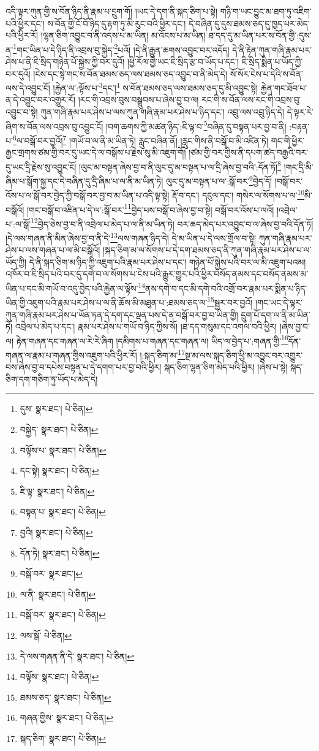 འདི་ལྟར་ཀུན་གྱི་ས་བོན་ཉིད་ནི་རྣམ་པ་དྲུག་གོ། །ཡང་དེ་དག་ནི་སྐད་ཅིག་པ་སྟེ། གཉི་ག་ཡང་བྱུང་མ་ཐག་ཏུ་འཇིག་པའི་ཕྱིར་དང་། ས་བོན་གྱི་ངོ་བོ་ཉིད་དུ་རྟག་ཏུ་མི་རུང་བའི་ཕྱིར་དང་། དེ་བཞིན་དུ་དུས་ཐམས་ཅད་དུ་ཁྱད་པར་མེད་པའི་ཕྱིར་རོ། །ལྷན་ཅིག་འབྱུང་བ་ནི་འདས་པ་མ་ཡིན། མ་འོངས་པ་མ་ཡིན། ཐ་དད་དུ་མ་ཡིན་པར་ས་བོན་གྱི་:དུས་ན་\footnote{དུས་  སྣར་ཐང་།  པེ་ཅིན། }གང་ཡིན་པ་དེ་ཉིད་ནི་འབྲས་བུ་སྐྱེད་\footnote{བསྐྱེད་  སྣར་ཐང་།  པེ་ཅིན། }པའོ། །དེ་ནི་རྒྱུན་ཆགས་འབྱུང་བར་འདོད། དེ་ནི་རྟེན་ཀུན་གཞི་རྣམ་པར་ཤེས་པ་ནི་ཇི་སྲིད་གཉེན་པོ་སྐྱེས་ཀྱི་བར་དུའོ། །ཕྱི་རོལ་གྱི་ཡང་ཇི་སྲིད་རྩ་བ་ཡོད་པ་དང་། ཇི་སྲིད་སྨིན་པ་ཡོད་ཀྱི་བར་དུའོ། །ངེས་དང་སྟེ་གང་ས་བོན་ཐམས་ཅད་ལས་ཐམས་ཅད་འབྱུང་བ་ནི་མེད་དེ། སོ་སོར་ངེས་པ་དེའི་ས་བོན་ལས་དེ་འབྱུང་ངོ། །རྐྱེན་ལ་:ལྟོས་པ་\footnote{བལྟོས་པ་  སྣར་ཐང་།  པེ་ཅིན། }དང་།\footnote{དང་སྟེ།  སྣར་ཐང་།  པེ་ཅིན། } ས་བོན་ཐམས་ཅད་ལས་ཐམས་ཅད་དུ་མི་འབྱུང་སྟེ། རྐྱེན་གང་ཐོབ་པ་ན་དེ་འབྱུང་བར་འགྱུར་རོ། །རང་གི་འབྲས་བུས་བསྒྲུབས་པ་ཞེས་བྱ་བ་ལ། རང་གི་ས་བོན་ལས་རང་གི་འབྲས་བུ་འབྱུང་བ་སྟེ། ཀུན་གཞི་རྣམ་པར་ཤེས་པ་ལས་ཀུན་གཞི་རྣམ་པར་ཤེས་པ་ཉིད་དང་། འབྲུ་ལས་འབྲུ་ཉིད་དེ། དེ་ལྟར་རེ་ཞིག་ས་བོན་ལས་འབྲས་བུ་འབྱུང་ངོ། །བག་ཆགས་ཀྱི་མཚན་ཉིད་:ཇི་ལྟ་བ་\footnote{ཇི་ལྟ་  སྣར་ཐང་།  པེ་ཅིན། }བཞིན་དུ་བསྟན་པར་བྱ་བ་ནི། :བརྟན་པ་\footnote{བསྟན་པ་  སྣར་ཐང་།  པེ་ཅིན། }ལ་བསྒོ་བར་བྱའོ།\footnote{བྱའི།  སྣར་ཐང་།  པེ་ཅིན། } །གཡོ་བ་ལ་ནི་མ་ཡིན་ཏེ། རླུང་བཞིན་ནོ། །རླུང་གིས་ནི་བསྒོ་བ་མི་འཛིན་ཏེ། གང་གི་ཕྱིར་རྒྱང་གྲགས་ཙམ་གྱི་བར་དུ་ཡང་དེ་ལ་བསྒོས་པ་རྗེས་སུ་མི་འཇུག་གོ། །ཙམ་གྱི་བར་གྱིས་ནི་དཔག་ཚད་བརྒྱའི་བར་དུ་ཡང་དྲི་རྗེས་སུ་འབྱུང་ངོ། །ལུང་མ་བསྟན་ཞེས་བྱ་བ་ནི་ལུང་དུ་མ་བསྟན་པ་ལ་དྲི་ཞེས་བྱ་བའི་:དོན་ཏོ།\footnote{དོན་ཏེ།  སྣར་ཐང་།  པེ་ཅིན། } །གང་དྲི་མི་ཞིམ་པ་སྒོག་སྐྱ་དང་དེ་བཞིན་དུ་དྲི་ཞིམ་པ་ལ་ནི་མ་ཡིན་ཏེ། ལུང་དུ་མ་བསྟན་པ་ལ་:སྒོ་བར་\footnote{བསྒོ་བར་  སྣར་ཐང་། }བྱེད་དོ། །བསྒོ་བར་འོས་པ་ལ་སྒོ་བར་བྱེད་ཀྱི་བསྒོ་བར་བྱ་བ་མ་ཡིན་པ་འདི་ལྟ་སྟེ། རྡོ་བ་དང་། དངུལ་དང་། གསེར་ལ་སོགས་པ་ལ་\footnote{ལ་ནི་  སྣར་ཐང་།  པེ་ཅིན། }མི་བསྒོའོ། །གང་བསྒོ་བ་འཛིན་པ་དེ་ལ་:སྒོ་བར་\footnote{བསྒོ་བར་  སྣར་ཐང་།  པེ་ཅིན། }བྱེད་པས་བསྒོ་བ་ཞེས་བྱ་བ་སྟེ། བསྒོ་བར་འོས་པ་ལའོ། །འབྲེལ་པ་:ལ་སྒོ་\footnote{ལས་སྒོ་  པེ་ཅིན། }བྱེད་ཅེས་བྱ་བ་ནི་འབྲེལ་པ་མེད་པ་ལ་ནི་མ་ཡིན་ཏེ། བར་ཆད་མེད་པར་འབྱུང་བ་ལ་ཞེས་བྱ་བའི་དོན་ཏོ། །དེ་ལས་གཞན་ནི་མིན་ཞེས་བྱ་བ་ནི་དེ་\footnote{དེ་ལས་གཞན་ནི་དེ་  སྣར་ཐང་།  པེ་ཅིན། }ལས་གཞན་ཉིད་དེ། དེ་མ་ཡིན་པ་དེ་ལས་གྲོལ་བ་སྟེ། ཀུན་གཞི་རྣམ་པར་ཤེས་པ་ལས་གཞན་པ་ལ་མི་བསྒོའོ། །སྐད་ཅིག་མ་ལ་སོགས་པ་དེ་དག་ཐམས་ཅད་ནི་ཀུན་གཞི་རྣམ་པར་ཤེས་པ་ལ་ཡོད་ཀྱི། དེ་ནི་སྐད་ཅིག་མ་ཉིད་ཀྱི་འཇུག་པའི་རྣམ་པར་ཤེས་པ་དང་། གཉེན་པོ་སྐྱེས་པའི་བར་ལ་མི་འཇུག་པའམ། འཁོར་བ་ཇི་སྲིད་པའི་བར་དུ་དགེ་བ་ལ་སོགས་པ་ངེས་པའི་རྒྱུར་གྱུར་པའི་ཕྱིར་བསོད་ནམས་དང་བསོད་ནམས་མ་ཡིན་པ་དང་མི་གཡོ་བ་འདུ་བྱེད་པའི་རྐྱེན་ལ་ལྟོས་\footnote{བལྟོས་  སྣར་ཐང་།  པེ་ཅིན། }ནས་དགེ་བ་དང་མི་དགེ་བའི་འགྲོ་བར་རྣམ་པར་སྨིན་པ་ཉིད་ཡིན་གྱི་འཇུག་པའི་རྣམ་པར་ཤེས་པ་ལ་ནི་ཆོས་མི་མཐུན་པ་:ཐམས་ཅད་ལ་\footnote{ཐམས་ཅད་  སྣར་ཐང་།  པེ་ཅིན། }སྦྱར་བར་བྱའོ། །གང་ཡང་དེ་ལྟར་ཀུན་གཞི་རྣམ་པར་ཤེས་པ་ཡོན་ཏན་དེ་དག་དང་ལྡན་པས་དེ་ན་བསྒོ་བར་བྱ་བ་ཡིན་གྱི། དྲུག་པོ་དག་ལ་ནི་མ་ཡིན་ཏེ། འབྲེལ་པ་མེད་པ་དང་། རྣམ་པར་ཤེས་པ་གཡོ་བ་ཉིད་ཀྱིས་སོ། །ཐ་དད་གསུམ་དང་འགལ་བའི་ཕྱིར། །ཞེས་བྱ་བ་ལ། རྟེན་གཞན་དང་གཞན་ལ་རེ་རེ་ཞིག །དམིགས་པ་གཞན་དང་གཞན་ལ། ཡིད་ལ་བྱེད་པ་:གཞན་གྱི་\footnote{གཞན་གྱིས་  སྣར་ཐང་།  པེ་ཅིན། }དོན་གཞན་ལ་རྣམ་པ་གཞན་གྱིས་འཇུག་པའི་ཕྱིར་རོ། །:སྐད་ཅིག་མ་\footnote{སྐད་ཅིག་  སྣར་ཐང་།  པེ་ཅིན། }སྔ་མ་ལས་སྐད་ཅིག་ཕྱི་མ་འབྱུང་བར་འགྱུར་བས་ཞེས་བྱ་བ་དཔེས་བསྟན་པ་དེ་དགག་པར་བྱ་བའི་ཕྱིར། སྐད་ཅིག་ལྷན་ཅིག་མེད་པའི་ཕྱིར། །ཞེས་པ་སྟེ། སྐད་ཅིག་དག་གཅིག་ཏུ་ཡོད་པ་མེད་དེ། 